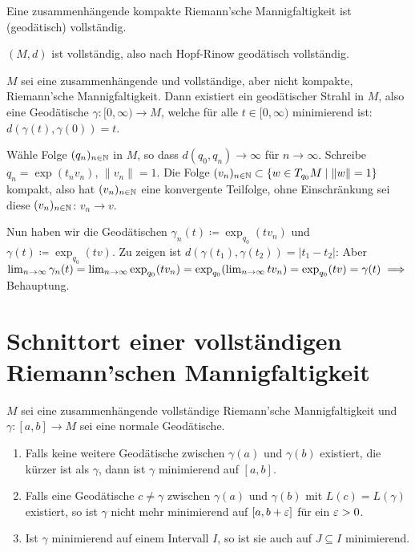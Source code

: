 \documentclass[a4paper,twoside,DIV15,BCOR12mm]{scrbook}
\renewcommand{\da}{\coloneqq}
\begin{document}
\begin{korrolar}
Eine zusammenhängende kompakte Riemann’sche Mannigfaltigkeit ist (geodätisch) vollständig.
\end{korrolar}

\begin{beweis}
$(M,d)$ ist vollständig, also nach Hopf-Rinow geodätisch vollständig.
\end{beweis}

\begin{korrolar}
$M$ sei eine zusammenhängende und vollständige, aber nicht kompakte, Riemann’sche Mannigfaltigkeit. Dann existiert ein geodätischer Strahl in $M$, also eine Geodätische $\gamma:[0,\infty)\to M$, welche für alle $t\in [0,\infty)$ minimierend ist: $d(\gamma(t),\gamma(0)) = t$.
\end{korrolar}

\begin{beweis}
Wähle Folge $(q_n)_{n\in\mathbb{N}}$ in $M$, so dass $d(q_0,q_n)\to \infty$ für $n\to\infty$. Schreibe $q_n = \exp(t_n v_n)$, $\|v_n\|=1$. Die Folge $(v_n)_{n\in\mathbb{N}} \subset \{ w \in T_{q_0}M\mid \|w\|=1\}$ kompakt, also hat $(v_n)_{n\in\mathbb{N}}$ eine konvergente Teilfolge, ohne Einschränkung sei diese $(v_n)_{n\in \mathbb{N}}$: $v_n \to v$.

Nun haben wir die Geodätischen $\gamma_n(t) \da \exp_{q_0}(tv_n)$ und  $\gamma(t) \da \exp_{q_0}(tv)$. Zu zeigen ist $d(\gamma(t_1), \gamma(t_2)) = |t_1 - t_2|$: Aber $\lim_{n\to\infty} \gamma_n(t) = \lim_{n\to\infty} \exp_{q_0}(tv_n) = \exp_{q_0}(\lim_{n\to\infty}tv_n) = \exp_{q_0}(tv) = \gamma(t) \implies$ Behauptung.
\end{beweis}

\section{Schnittort einer vollständigen Riemann’schen Mannigfaltigkeit}
\label{schnittort}

\begin{lemma}
$M$ sei eine zusammenhängende vollständige Riemann’sche Mannigfaltigkeit und $\gamma:[a,b]\to M$ sei eine normale Geodätische.

\begin{enumerate}
\item Falls keine weitere Geodätische zwischen $\gamma(a)$ und $\gamma(b)$ existiert, die kürzer ist als $\gamma$, dann ist $\gamma$ minimierend auf $[a,b]$.
\item Falls eine Geodätische $c\ne \gamma$ zwischen $\gamma(a)$ und $\gamma(b)$ mit $L(c)=L(\gamma)$ existiert, so ist $\gamma$ nicht mehr minimierend auf $[a,b+\varepsilon]$ für ein $\varepsilon >0$.
\item Ist $\gamma$ minimierend auf einem Intervall $I$, so ist sie auch auf $J\subseteq I$ minimierend.
\end{enumerate}
\end{lemma}
\end{document}
